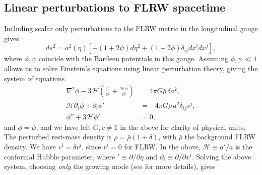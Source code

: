 \subsection{Linear perturbations to FLRW spacetime}

Including scalar only perturbations to the FLRW metric in the longitudinal gauge gives
\begin{equation}\label{EinsteinInitialData_flrwsolver_eq:perturbed_metric}
	ds^2 = a^2(\eta) \left[ - \left(1 + 2\psi\right) d\eta^2 + \left(1 - 2\phi \right) \delta_{ij}dx^i dx^j \right],
\end{equation}
where $\phi,\psi$ coincide with the Bardeen potentials \cite{EinsteinInitialData_flrwsolver_bardeen1980} in this gauge. Assuming $\phi,\psi\ll1$ allows us to solve Einstein's equations using linear perturbation theory, giving the system of equations \cite{EinsteinInitialData_flrwsolver_macpherson2017,EinsteinInitialData_flrwsolver_macpherson2019}
 \begin{subequations} \label{EinsteinInitialData_flrwsolver_eqs:perturbed_einstein}
	\begin{align}
		\nabla^{2}\phi - 3 \mathcal{H}\left(\frac{\phi'}{c^2} + \frac{\mathcal{H} \phi}{c^2}\right) &= 4\pi G \bar{\rho}\,\delta a^{2}, \label{EinsteinInitialData_flrwsolver_eq:einstein_1} \\ 
		\mathcal{H} \partial_{i}\phi + \partial_{i}\phi' &= -4\pi G\bar{\rho} \,a^{2} \delta_{ij}v^{j}, \label{EinsteinInitialData_flrwsolver_eq:einstein_2} \\ 
		\phi'' + 3\mathcal{H}\phi' &=0, \label{EinsteinInitialData_flrwsolver_eq:einstein_3}
	\end{align}	
\end{subequations}
and $\phi=\psi$, and we have left $G, c\neq 1$ in the above for clarity of physical units. The perturbed rest-mass density is $\rho = \bar{\rho} \left(1 + \delta \right)$, with $\bar{\rho}$ the background FLRW density. We have $v^i = \delta v^i$, since $\bar{v}^i = 0$ for FLRW. In the above, $\mathcal{H}\equiv a'/a$ is the conformal Hubble parameter, where $'\equiv \partial/\partial\eta$ and $\partial_i \equiv \partial/\partial x^i$. Solving the above system, choosing \emph{only} the growing mode (see \cite{EinsteinInitialData_flrwsolver_macpherson2019} for more details), gives
